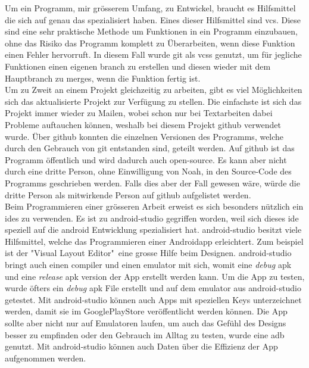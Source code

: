 \documentclass[a4paper,11pt]{article}
\begin{document}
Um ein Programm, mir grösserem Umfang, zu Entwickel, braucht es Hilfsmittel die sich auf genau das spezialisiert haben. 
Eines dieser Hilfsmittel sind \gls{vcs}. Diese sind eine sehr praktische Methode um Funktionen in ein Programm einzubauen, ohne das Risiko 
das Programm komplett zu Überarbeiten, wenn diese Funktion einen Fehler hervorruft. In diesem Fall wurde \Gls{git} als \Glspl{vcs} genutzt, um für jegliche Funktionen
einen eigenen \gls{branch} zu erstellen und diesen wieder mit dem Hauptbranch zu \glspl{merge}, wenn die Funktion fertig ist.\cite{git} \cite{github} \\

Um zu Zweit an einem Projekt gleichzeitig zu arbeiten, gibt es viel Möglichkeiten sich das aktualisierte Projekt zur Verfügung zu stellen. Die einfachste ist sich das 
Projekt immer wieder zu Mailen, wobei schon nur bei Textarbeiten dabei Probleme auftauchen können, weshalb bei diesem Projekt \Gls{github} 
verwendet wurde. Über \gls{github} konnten die einzelnen Versionen des Programms, welche durch den Gebrauch von \gls{git} entstanden sind, geteilt werden. 
Auf \gls{github} ist das Programm öffentlich und wird dadurch auch open-source. Es kann aber nicht durch eine dritte Person, ohne Einwilligung von Noah, in den Source-Code
des Programms geschrieben werden. Falls dies aber der Fall gewesen wäre, würde die dritte Person als mitwirkende Person auf \gls{github} aufgelistet werden. \cite{github} \\

Beim Programmieren einer grösseren Arbeit erweist es sich besonders nützlich ein \glspl{ide} zu verwenden. Es ist zu \gls{android-studio} gegriffen worden, weil sich dieses \gls{ide}
speziell auf die android Entwicklung spezialisiert hat. \gls{android-studio} besitzt viele Hilfsmittel, welche das Programmieren einer Androidapp erleichtert. Zum beispiel ist der
"Visual Layout Editor"\ eine grosse Hilfe beim Designen. \gls{android-studio} bringt auch einen \gls{compiler} und einen \gls{emulator} mit sich, womit eine \textit{debug} \gls{apk} und eine
\textit{release} \gls{apk} version der App erstellt werden kann. Um die App zu testen, wurde öfters ein \textit{debug} \gls{apk} File erstellt und auf dem \gls{emulator} aus \gls{android-studio}
getestet. Mit \gls{android-studio} können auch Apps mit speziellen Keys unterzeichnet werden, damit sie im GooglePlayStore veröffentlicht werden können.
Die App sollte aber nicht nur auf Emulatoren laufen, um auch das Gefühl des Designs besser zu empfinden oder den Gebrauch im Alltag zu testen, wurde eine \gls{adb} genutzt.
Mit \gls{android-studio} können auch Daten über die Effizienz der App aufgenommen werden. 
\cite{android-studio} \\
\end{document}
